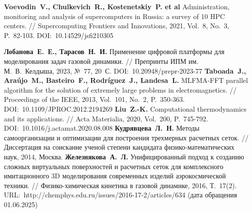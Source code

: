 \begin{thebibliography}{99}
\textbf{Voevodin~V., Chulkevich~R., Kostenetskiy~P. et al} Administration, monitoring and analysis of supercomputers in Russia: a survey of 10 HPC centers. // Supercomputing Frontiers and Innovations, 2021, Vol.~8, No.~3, P.~82-103. DOI:~10.14529/jsfi210305

\textbf{Лобанова~Е.~Е., Тарасов~Н.~И.} Применение цифровой платформы для моделирования задач газовой динамики. // Препринты ИПМ им. М.~В.~Келдыша, 2023, №~77, 20~С. DOI:~10.20948/prepr-2023-77
\textbf{Taboada~J., Ara{\'u}jo~M., Basteiro~F., Rodr{\'i}guez~J., Landesa~L.} MLFMA-FFT parallel algorithm for the solution of extremely large problems in electromagnetics. // Proceedings of the IEEE, 2013, Vol.~101, No.~2, P.~350-363. DOI:~10.1109/JPROC.2012.2194269
\textbf{Liu~Z.-K.} Computational thermodynamics and its applications. // Acta Materialia, 2020, Vol.~200, P.~745-792. DOI:~10.1016/j.actamat.2020.08.008
\textbf{Кудрявцева~Л.~Н.} Методы самоорганизации и оптимизации для построения трехмерных расчетных сеток. // Диссертация на соискание ученой степени кандидата физико-математических наук, 2014, Москва.
\textbf{Железнякова~А.~Л.} Унифицированный подход к созданию сложных виртуальных поверхностей и расчетных сеток для комплексного имитационного 3D моделирования современных изделий аэрокосмической техники. // Физико-химическая кинетика в газовой динамике, 2016, Т.~17(2). URL:~http://chemphys.edu.ru/issues/2016-17-2/articles/634 (дата обращения 01.06.2025)


\end{thebibliography}
